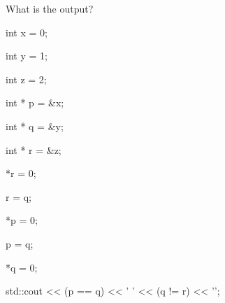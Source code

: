 What is the output?



\begin{consolethree}[escapeinside=||]

int x = 0;

int y = 1;

int z = 2;

int * p = &x;

int * q = &y;

int * r = &z;

*r = 0;

r = q;

*p = 0;

p = q;

*q = 0;

std::cout << (p == q) << ' ' << (q != r) << '\n';

\end{consolethree}

